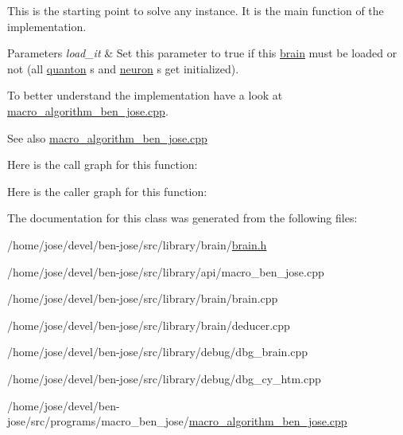 This is the starting point to solve any instance. It is the main function of the implementation. 


\begin{DoxyParams}{Parameters}
{\em load\+\_\+it} & Set this parameter to true if this \hyperlink{classbrain}{brain} must be loaded or not (all \hyperlink{classquanton}{quanton} s and \hyperlink{classneuron}{neuron} s get initialized).\\
\hline
\end{DoxyParams}
To better understand the implementation have a look at \hyperlink{macro__algorithm__ben__jose_8cpp}{macro\+\_\+algorithm\+\_\+ben\+\_\+jose.\+cpp}. \begin{DoxySeeAlso}{See also}
\hyperlink{macro__algorithm__ben__jose_8cpp}{macro\+\_\+algorithm\+\_\+ben\+\_\+jose.\+cpp} 
\end{DoxySeeAlso}


Here is the call graph for this function\+:




Here is the caller graph for this function\+:




The documentation for this class was generated from the following files\+:\begin{DoxyCompactItemize}
\item 
/home/jose/devel/ben-\/jose/src/library/brain/\hyperlink{brain_8h}{brain.\+h}\item 
/home/jose/devel/ben-\/jose/src/library/api/macro\+\_\+ben\+\_\+jose.\+cpp\item 
/home/jose/devel/ben-\/jose/src/library/brain/brain.\+cpp\item 
/home/jose/devel/ben-\/jose/src/library/brain/deducer.\+cpp\item 
/home/jose/devel/ben-\/jose/src/library/debug/dbg\+\_\+brain.\+cpp\item 
/home/jose/devel/ben-\/jose/src/library/debug/dbg\+\_\+cy\+\_\+htm.\+cpp\item 
/home/jose/devel/ben-\/jose/src/programs/macro\+\_\+ben\+\_\+jose/\hyperlink{macro__algorithm__ben__jose_8cpp}{macro\+\_\+algorithm\+\_\+ben\+\_\+jose.\+cpp}\end{DoxyCompactItemize}
